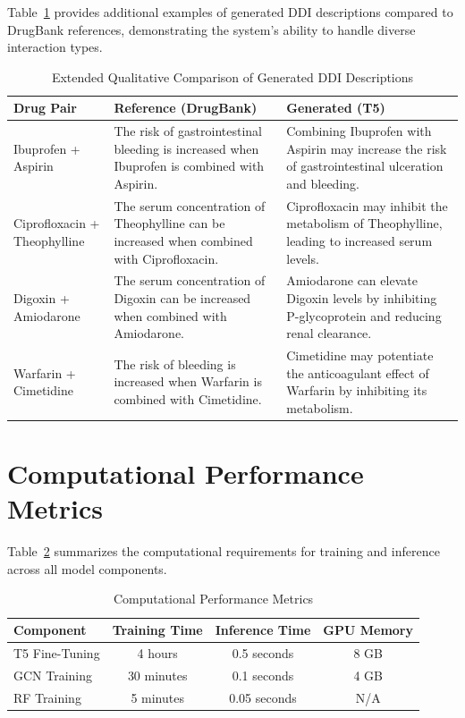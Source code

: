 \documentclass[12pt,a4paper,oneside]{report}
\begin{document}
Table~\ref{tab:extended_qual} provides additional examples of generated DDI descriptions
compared to DrugBank references, demonstrating the system's ability to handle diverse
interaction types.

\begin{table}[htbp]
\centering
\caption{Extended Qualitative Comparison of Generated DDI Descriptions}
\label{tab:extended_qual}
\begin{tabular}{p{2.5cm} p{5cm} p{5cm}}
\toprule
\textbf{Drug Pair} & \textbf{Reference (DrugBank)} & \textbf{Generated (T5)} \\
\midrule
Ibuprofen + Aspirin &
  The risk of gastrointestinal bleeding is increased when Ibuprofen is combined with Aspirin. &
  Combining Ibuprofen with Aspirin may increase the risk of gastrointestinal ulceration and bleeding. \\[1ex]
Ciprofloxacin + Theophylline &
  The serum concentration of Theophylline can be increased when combined with Ciprofloxacin. &
  Ciprofloxacin may inhibit the metabolism of Theophylline, leading to increased serum levels. \\[1ex]
Digoxin + Amiodarone &
  The serum concentration of Digoxin can be increased when combined with Amiodarone. &
  Amiodarone can elevate Digoxin levels by inhibiting P-glycoprotein and reducing renal clearance. \\[1ex]
Warfarin + Cimetidine &
  The risk of bleeding is increased when Warfarin is combined with Cimetidine. &
  Cimetidine may potentiate the anticoagulant effect of Warfarin by inhibiting its metabolism. \\
\bottomrule
\end{tabular}
\end{table}

\section{Computational Performance Metrics}

Table~\ref{tab:performance} summarizes the computational requirements for training and
inference across all model components.

\begin{table}[htbp]
\centering
\caption{Computational Performance Metrics}
\label{tab:performance}
\begin{tabular}{lccc}
\toprule
\textbf{Component} & \textbf{Training Time} & \textbf{Inference Time} & \textbf{GPU Memory} \\
\midrule
T5 Fine-Tuning & 4 hours & 0.5 seconds & 8 GB \\
GCN Training & 30 minutes & 0.1 seconds & 4 GB \\
RF Training & 5 minutes & 0.05 seconds & N/A \\
\bottomrule
\end{tabular}
\end{table}
\end{document}
